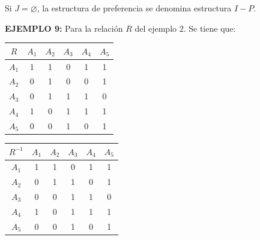 \documentclass[a5paper,doc,10pt,noapacite]{apa6}
\begin{document}
{{\vspace{1\baselineskip}
Si \(J = \varnothing\), la estructura de preferencia se denomina estructura \(I-P\).


\vspace{1\baselineskip}
\textbf{EJEMPLO 9:} 
Para la relación \(R\) del ejemplo 2. Se tiene que:

\begin{table}[H]
	\fontsize{7}{11}\selectfont
    \begin{minipage}{.5\linewidth}
      \centering
	\begin{tabular}{c|ccccc} \thickline
	\(R\) & \(A_1\) & \(A_2\) & \(A_3\) & \(A_4\) & \(A_5\)  \\ \hline
    \(A_1\) & 1 & 1 & 0 & 1 & 1  \\
    \(A_2\) & 0 & 1 & 0 & 0 & 1  \\
	\(A_3\) & 0 & 1 & 1 & 1 & 0   \\
	\(A_4\) & 1 & 0 & 1 & 1 & 1   \\
	\(A_5\) & 0 & 0 & 1 & 0 & 1   \\
\end{tabular}
\label{tab:B2} 
    \end{minipage}%
    \begin{minipage}{.5\linewidth}
      \centering
	\begin{tabular}{c|ccccc} \thickline
	\(R^{-1}\) & \(A_1\) & \(A_2\) & \(A_3\) & \(A_4\) & \(A_5\)  \\ \hline
    \(A_1\) & 1 & 1 & 0 & 1 & 1  \\
    \(A_2\) & 0 & 1 & 1 & 0 & 1  \\
	\(A_3\) & 0 & 0 & 1 & 1 & 0   \\
	\(A_4\) & 1 & 0 & 1 & 1 & 1   \\
	\(A_5\) & 0 & 0 & 1 & 0 & 1   \\
\end{tabular}
\label{tab:B3}
    \end{minipage} 
\end{table}
%

}}
\end{document}
